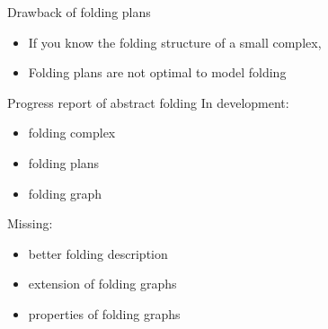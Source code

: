 \begin{frame}{Drawback of folding plans}
    \begin{itemize}
        \item<6->[$\Rightarrow$]If you know the folding structure of a small complex,
        \item<8->[$\leadsto$]Folding plans are not optimal to model folding
    \end{itemize}
\end{frame}


\begin{frame}{Progress report of abstract folding}
    \pause
    In development:
    \begin{itemize}
        \pause
        \item folding complex
        \pause
        \item folding plans
        \pause
        \item folding graph
    \end{itemize}

    \pause
    Missing:
    \begin{itemize}
        \pause
        \item better folding description
        \pause
        \item extension of folding graphs
        \pause
        \item properties of folding graphs
    \end{itemize}
\end{frame}



